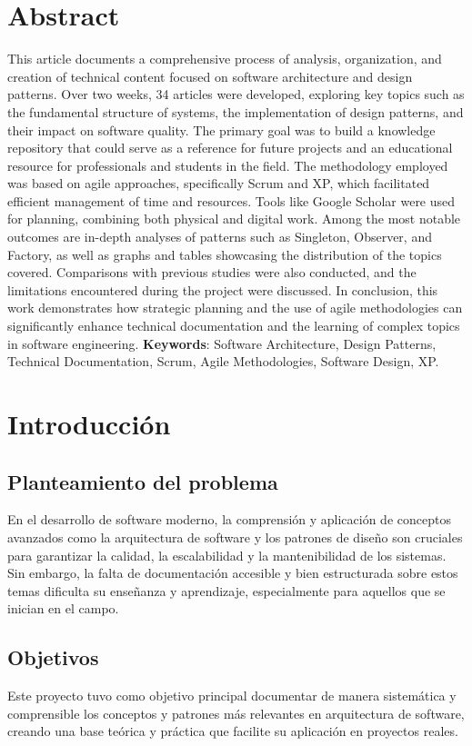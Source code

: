\documentclass[12pt, a4paper]{article}
\begin{document}
\section{Abstract}
This article documents a comprehensive process of analysis, organization, and creation of technical content focused on software architecture and design patterns. Over two weeks, 34 articles were developed, exploring key topics such as the fundamental structure of systems, the implementation of design patterns, and their impact on software quality. The primary goal was to build a knowledge repository that could serve as a reference for future projects and an educational resource for professionals and students in the field. The methodology employed was based on agile approaches, specifically Scrum and XP, which facilitated efficient management of time and resources. Tools like Google Scholar were used for planning, combining both physical and digital work. Among the most notable outcomes are in-depth analyses of patterns such as Singleton, Observer, and Factory, as well as graphs and tables showcasing the distribution of the topics covered. Comparisons with previous studies were also conducted, and the limitations encountered during the project were discussed. In conclusion, this work demonstrates how strategic planning and the use of agile methodologies can significantly enhance technical documentation and the learning of complex topics in software engineering.
\textbf{Keywords}: Software Architecture, Design Patterns, Technical Documentation, Scrum, Agile Methodologies, Software Design, XP.



\section{Introducción}

\subsection{Planteamiento del problema}
En el desarrollo de software moderno, la comprensión y aplicación de conceptos avanzados como la arquitectura de software y los patrones de diseño son cruciales para garantizar la calidad, la escalabilidad y la mantenibilidad de los sistemas. Sin embargo, la falta de documentación accesible y bien estructurada sobre estos temas dificulta su enseñanza y aprendizaje, especialmente para aquellos que se inician en el campo.

\subsection{Objetivos}
Este proyecto tuvo como objetivo principal documentar de manera sistemática y comprensible los conceptos y patrones más relevantes en arquitectura de software, creando una base teórica y práctica que facilite su aplicación en proyectos reales.
\end{document}
